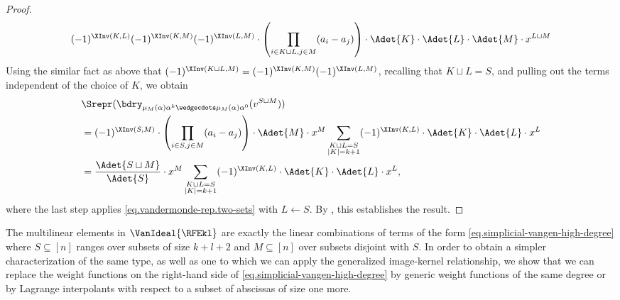 \begin{proof}
\[ (-1)^{\XInv(K,L)} (-1)^{\XInv(K,M)} (-1)^{\XInv(L,M)} \cdot \left( \prod_{i\in K \sqcup L, j \in M} (a_i-a_j) \right)  \cdot \Adet{K} \cdot \Adet{L} \cdot \Adet{M} \cdot x^{L \sqcup M} \]
Using the similar fact as above that  
$(-1)^{\XInv(K \sqcup L,M)} = (-1)^{\XInv(K,M)} (-1)^{\XInv(L,M)}$, recalling that $K \sqcup L = S$, and pulling out the terms independent of the choice of $K$, we obtain
\begin{align*}
&\Srepr(\bdry_{\mu_M(\alpha)\alpha^k\wedgecdots \mu_M(\alpha)\alpha^0}(v^{S \sqcup M})) \\
&= (-1)^{\XInv(S,M)} \cdot \left( \prod_{i\in S, j \in M} (a_i-a_j) \right)
\cdot \Adet{M} \cdot x^M \sum_{\substack{K\sqcup L=S\\ |K|=k+1}} (-1)^{\XInv(K,L)} \cdot \Adet{K} \cdot \Adet{L} \cdot x^L \\
%
&= \frac{\Adet{S \sqcup M}}{\Adet{S}} \cdot x^M \sum_{\substack{K\sqcup L=S\\ |K|=k+1}} (-1)^{\XInv(K,L)} \cdot \Adet{K} \cdot \Adet{L} \cdot x^L,
\end{align*}
where the last step applies \eqref{eq.vandermonde-rep.two-sets} with $L \gets S$. By , this establishes the result.
\end{proof}

The multilinear elements in \(\VanIdeal{\RFEkl}\) are exactly the linear combinations of terms of the form \eqref{eq.simplicial-vangen-high-degree} where $S \subseteq [n]$ ranges over subsets of size $k+l+2$ and $M \subseteq [n]$ over subsets disjoint with $S$. In order to obtain a simpler characterization of the same type, as well as one to which we can apply the generalized image-kernel relationship, we show that we can replace the weight functions on the right-hand side of \eqref{eq.simplicial-vangen-high-degree} by generic weight functions of the same degree or by Lagrange interpolants with respect to a subset of abscissas of size one more. 

